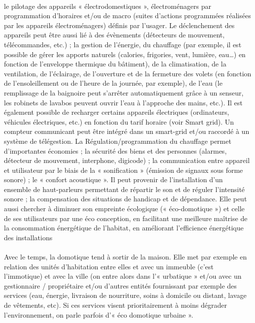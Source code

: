             \paragraph{}
le pilotage des appareils « électrodomestiques », électroménagers par programmation d'horaires et/ou de macro (suites d'actions programmées réalisées par les appareils électroménagers) définis par l'usager. Le déclenchement des appareils peut être aussi lié à des évènements (détecteurs de mouvement, télécommandes, etc.) ;
la gestion de l'énergie, du chauffage (par exemple, il est possible de gérer les apports naturels (calories, frigories, vent, lumière, eau…) en fonction de l'enveloppe thermique du bâtiment), de la climatisation, de la ventilation, de l'éclairage, de l’ouverture et de la fermeture des volets (en fonction de l'ensoleillement ou de l'heure de la journée, par exemple), de l'eau (le remplissage de la baignoire peut s’arrêter automatiquement grâce à un senseur, les robinets de lavabos peuvent ouvrir l’eau à l’approche des mains, etc.). Il est également possible de recharger certains appareils électriques (ordinateurs, véhicules électriques, etc.) en fonction du tarif horaire (voir Smart grid). Un compteur communicant peut être intégré dans un smart-grid et/ou raccordé à un système de télégestion. La Régulation/programmation du chauffage permet d'importantes économies ;
la sécurité des biens et des personnes (alarmes, détecteur de mouvement, interphone, digicode) ;
la communication entre appareil et utilisateur par le biais de la « sonification » (émission de signaux sous forme sonore) ;
le « confort acoustique ». Il peut provenir de l'installation d'un ensemble de haut-parleurs permettant de répartir le son et de réguler l’intensité sonore ;
la compensation des situations de handicap et de dépendance.
Elle peut aussi chercher à diminuer son empreinte écologique (« éco-domotique ») et celle de ses utilisateurs par une éco conception, en facilitant une meilleure maîtrise de la consommation énergétique de l'habitat, en améliorant l'efficience énergétique des installations
            \paragraph{}
Avec le temps, la domotique tend à sortir de la maison. Elle met par exemple en relation des unités d'habitation entre elles et avec un immeuble (c'est l'immotique) et avec la ville (on entre alors dans l'« urbatique » et/ou avec un gestionnaire / propriétaire et/ou d'autres entités fournissant par exemple des services (eau, énergie, livraison de nourriture, soins à domicile ou distant, lavage de vêtements, etc). Si ces services visent prioritairement à moins dégrader l'environnement, on parle parfois d'« éco domotique urbaine ».

